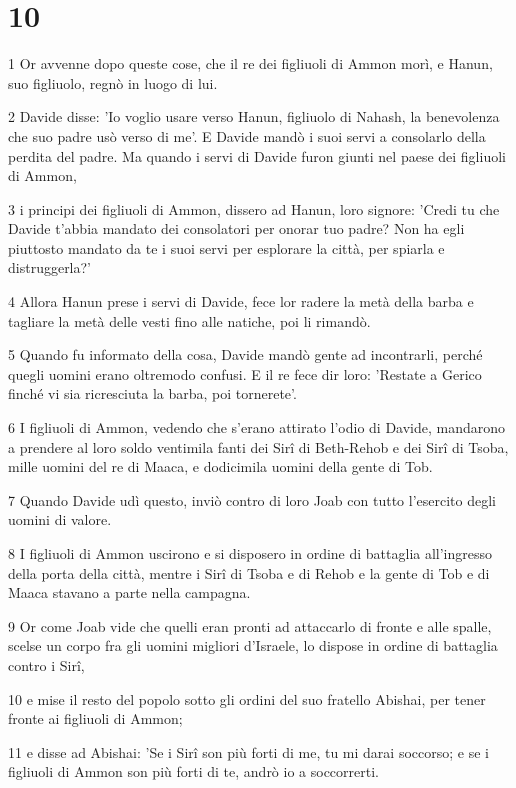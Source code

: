 \chapter{10}

\par 1 Or avvenne dopo queste cose, che il re dei figliuoli di Ammon morì, e Hanun, suo figliuolo, regnò in luogo di lui.
\par 2 Davide disse: 'Io voglio usare verso Hanun, figliuolo di Nahash, la benevolenza che suo padre usò verso di me'. E Davide mandò i suoi servi a consolarlo della perdita del padre. Ma quando i servi di Davide furon giunti nel paese dei figliuoli di Ammon,
\par 3 i principi dei figliuoli di Ammon, dissero ad Hanun, loro signore: 'Credi tu che Davide t'abbia mandato dei consolatori per onorar tuo padre? Non ha egli piuttosto mandato da te i suoi servi per esplorare la città, per spiarla e distruggerla?'
\par 4 Allora Hanun prese i servi di Davide, fece lor radere la metà della barba e tagliare la metà delle vesti fino alle natiche, poi li rimandò.
\par 5 Quando fu informato della cosa, Davide mandò gente ad incontrarli, perché quegli uomini erano oltremodo confusi. E il re fece dir loro: 'Restate a Gerico finché vi sia ricresciuta la barba, poi tornerete'.
\par 6 I figliuoli di Ammon, vedendo che s'erano attirato l'odio di Davide, mandarono a prendere al loro soldo ventimila fanti dei Sirî di Beth-Rehob e dei Sirî di Tsoba, mille uomini del re di Maaca, e dodicimila uomini della gente di Tob.
\par 7 Quando Davide udì questo, inviò contro di loro Joab con tutto l'esercito degli uomini di valore.
\par 8 I figliuoli di Ammon uscirono e si disposero in ordine di battaglia all'ingresso della porta della città, mentre i Sirî di Tsoba e di Rehob e la gente di Tob e di Maaca stavano a parte nella campagna.
\par 9 Or come Joab vide che quelli eran pronti ad attaccarlo di fronte e alle spalle, scelse un corpo fra gli uomini migliori d'Israele, lo dispose in ordine di battaglia contro i Sirî,
\par 10 e mise il resto del popolo sotto gli ordini del suo fratello Abishai, per tener fronte ai figliuoli di Ammon;
\par 11 e disse ad Abishai: 'Se i Sirî son più forti di me, tu mi darai soccorso; e se i figliuoli di Ammon son più forti di te, andrò io a soccorrerti.
